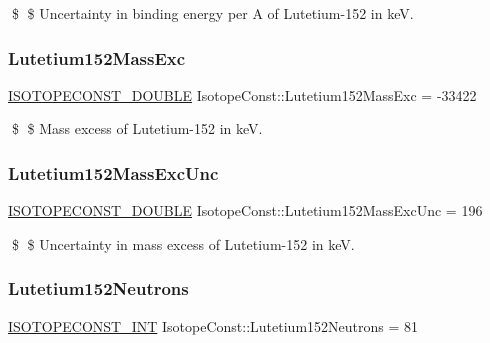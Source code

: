 \$ \$ Uncertainty in binding energy per A of Lutetium-\/152 in keV. \mbox{\label{group___isotope_const-_lutetium-_lu152_ga1f227fd11fdc6ddaf4b0b8fa7ab64995}} 
\subsubsection{\texorpdfstring{Lutetium152\+Mass\+Exc}{Lutetium152MassExc}}
{\footnotesize\ttfamily \mbox{\hyperlink{group___isotope_const-_macros_ga8f45a7272ce02c0b4c65c44636ed719a}{I\+S\+O\+T\+O\+P\+E\+C\+O\+N\+S\+T\+\_\+\+D\+O\+U\+B\+LE}} Isotope\+Const\+::\+Lutetium152\+Mass\+Exc = -\/33422}

\$ \$ Mass excess of Lutetium-\/152 in keV. \mbox{\label{group___isotope_const-_lutetium-_lu152_ga4f5294414f3c2e5a9ab49c1887b2e3a8}} 
\subsubsection{\texorpdfstring{Lutetium152\+Mass\+Exc\+Unc}{Lutetium152MassExcUnc}}
{\footnotesize\ttfamily \mbox{\hyperlink{group___isotope_const-_macros_ga8f45a7272ce02c0b4c65c44636ed719a}{I\+S\+O\+T\+O\+P\+E\+C\+O\+N\+S\+T\+\_\+\+D\+O\+U\+B\+LE}} Isotope\+Const\+::\+Lutetium152\+Mass\+Exc\+Unc = 196}

\$ \$ Uncertainty in mass excess of Lutetium-\/152 in keV. \mbox{\label{group___isotope_const-_lutetium-_lu152_ga85bb0cf552b3901a5e294d84d21d26ae}} 
\subsubsection{\texorpdfstring{Lutetium152\+Neutrons}{Lutetium152Neutrons}}
{\footnotesize\ttfamily \mbox{\hyperlink{group___isotope_const-_macros_ga5f18360b3e99483a35c32d789e62621c}{I\+S\+O\+T\+O\+P\+E\+C\+O\+N\+S\+T\+\_\+\+I\+NT}} Isotope\+Const\+::\+Lutetium152\+Neutrons = 81}

